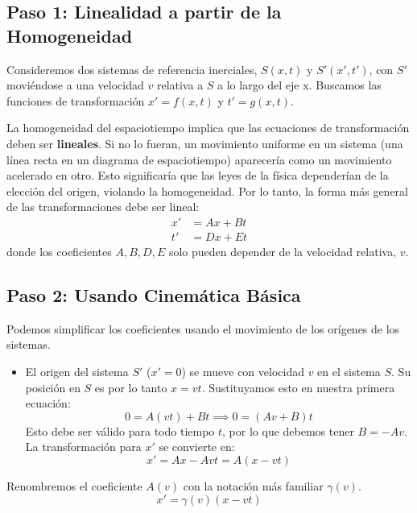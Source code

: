 \documentclass[11pt,a4paper]{article}
\begin{document}
\subsection{Paso 1: Linealidad a partir de la Homogeneidad}
Consideremos dos sistemas de referencia inerciales, $S(x,t)$ y $S'(x',t')$, con $S'$ moviéndose a una velocidad $v$ relativa a $S$ a lo largo del eje x. Buscamos las funciones de transformación $x' = f(x,t)$ y $t' = g(x,t)$.

La homogeneidad del espaciotiempo implica que las ecuaciones de transformación deben ser \textbf{lineales}. Si no lo fueran, un movimiento uniforme en un sistema (una línea recta en un diagrama de espaciotiempo) aparecería como un movimiento acelerado en otro. Esto significaría que las leyes de la física dependerían de la elección del origen, violando la homogeneidad. Por lo tanto, la forma más general de las transformaciones debe ser lineal:
\begin{align*}
x' &= Ax + Bt \\
t' &= Dx + Et
\end{align*}
donde los coeficientes $A, B, D, E$ solo pueden depender de la velocidad relativa, $v$.

\subsection{Paso 2: Usando Cinemática Básica}
Podemos simplificar los coeficientes usando el movimiento de los orígenes de los sistemas.
\begin{itemize}
    \item El origen del sistema $S'$ ($x'=0$) se mueve con velocidad $v$ en el sistema $S$. Su posición en $S$ es por lo tanto $x=vt$. Sustituyamos esto en nuestra primera ecuación:
    \[ 0 = A(vt) + Bt \implies 0 = (Av+B)t \]
    Esto debe ser válido para todo tiempo $t$, por lo que debemos tener $B = -Av$. La transformación para $x'$ se convierte en:
    \[ x' = Ax - Avt = A(x-vt) \]
\end{itemize}
Renombremos el coeficiente $A(v)$ con la notación más familiar $\gamma(v)$.
\begin{equation} \label{eq:x_prime}
x' = \gamma(v)(x - vt)
\end{equation}
\end{document}
